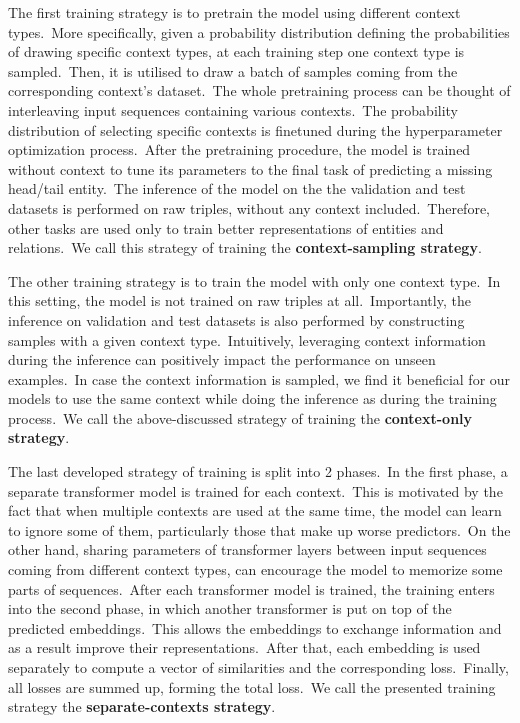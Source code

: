 \documentclass[longabstract, english, mgr]{iithesis}
\theoremstyle{default_theorem_style}\newtheorem{theorem}{Theorem}
\theoremstyle{default_theorem_style}\newtheorem{definition}{Definition}
\begin{document}
\noindent The first training strategy is to pretrain the model using different context types.\ More specifically,
given a probability distribution defining the probabilities of drawing specific context types, at each training step
one context type is sampled.\ Then, it is utilised to draw a batch of samples coming from the corresponding context's
dataset.\ The whole pretraining process can be thought of interleaving input sequences containing various
contexts.\ The probability distribution of selecting specific contexts is finetuned during the hyperparameter
optimization process.\ After the pretraining procedure, the model is trained without context to tune its parameters
to the final task of predicting a missing head/tail entity.\ The inference of the model on the the validation and test
datasets is performed on raw triples, without any context included.\ Therefore, other tasks are used only to train
better representations of entities and relations.\ We call this strategy of training the
\textbf{context-sampling strategy}.\newline

\noindent The other training strategy is to train the model with only one context type.\ In this setting, the model
is not trained on raw triples at all.\ Importantly, the inference on validation and test datasets is also performed by
constructing samples with a given context type.\ Intuitively, leveraging context information during the inference
can positively impact the performance on unseen examples.\ In case the context information is sampled, we find it
beneficial for our models to use the same context while doing the inference as during the training
process.\ We call the above-discussed strategy of training the \textbf{context-only strategy}.\newline

\noindent The last developed strategy of training is split into 2 phases.\ In the first phase, a separate transformer
model is trained for each context.\ This is motivated by the fact that when multiple contexts are used at the same
time, the model can learn to ignore some of them, particularly those that make up worse predictors.\ On the other
hand, sharing parameters of transformer layers between input sequences coming from different context types, can
encourage the model to memorize some parts of sequences.\ After each transformer model is trained, the training enters
into the second phase, in which another transformer is put on top of the predicted embeddings.\ This allows the
embeddings to exchange information and as a result improve their representations.\ After that, each embedding is used
separately to compute a vector of similarities and the corresponding loss.\ Finally, all losses are summed up,
forming the total loss.\ We call the presented training strategy the \textbf{separate-contexts strategy}.
\end{document}
